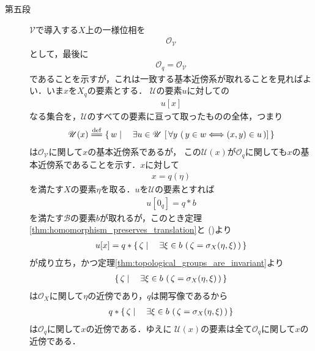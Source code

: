 \begin{sketch}
\begin{description}
			\item[第五段]
				$\mathscr{V}$で導入する$X$上の一様位相を
				\begin{align}
					\mathscr{O}_{\mathscr{V}}
				\end{align}
				として，最後に
				\begin{align}
					\mathscr{O}_q = \mathscr{O}_{\mathscr{V}}
				\end{align}
				であることを示すが，これは一致する基本近傍系が取れることを見ればよい．いま$x$を$X_q$の要素とする．
				$\mathscr{U}$の要素$u$に対しての
				\begin{align}
					u[x]
				\end{align}
				なる集合を，$\mathscr{U}$のすべての要素に亘って取ったものの全体，つまり
				\begin{align}
					\mathscr{U}(x) \defeq 
					\Set{w}{\exists u \in \mathscr{U}\, 
					\left[\, \forall y\, \left(\, y \in w \Longleftrightarrow (x,y) \in u\, \right) \right]}
				\end{align}
				は$\mathscr{O}_{\mathscr{V}}$に関して$x$の基本近傍系であるが，
				この$\mathscr{U}(x)$が$\mathscr{O}_q$に関しても$x$の基本近傍系であることを示す．$x$に対して
				\begin{align}
					x = q(\eta)
				\end{align}
				を満たす$X$の要素$\eta$を取る．$u$を$\mathscr{U}$の要素とすれば
				\begin{align}
					u[0_q] = q \ast b
				\end{align}
				を満たす$\mathscr{B}$の要素$b$が取れるが，このとき定理\ref{thm:homomorphism_preserves_translation}と
				()より
				\begin{align}
					u[x] = q \ast \left\{\, \zeta \mid \quad \exists \xi \in b\, 
					\left(\, \zeta = \sigma_X(\eta,\xi)\, \right)\, \right\}
				\end{align}
				が成り立ち，かつ定理\ref{thm:topological_groups_are_invariant}より
				\begin{align}
					\left\{\, \zeta \mid \quad \exists \xi \in b\, \left(\, \zeta = \sigma_X(\eta,\xi)\, \right)\, \right\}
				\end{align}
				は$\mathscr{O}_X$に関して$\eta$の近傍であり，$q$は開写像であるから
				\begin{align}
					q \ast \left\{\, \zeta \mid \quad \exists \xi \in b\, \left(\, \zeta = \sigma_X(\eta,\xi)\, \right)\, \right\}
				\end{align}
				は$\mathscr{O}_q$に関して$x$の近傍である．ゆえに
				$\mathscr{U}(x)$の要素は全て$\mathscr{O}_q$に関して$x$の近傍である．

\end{description}
\end{sketch}
